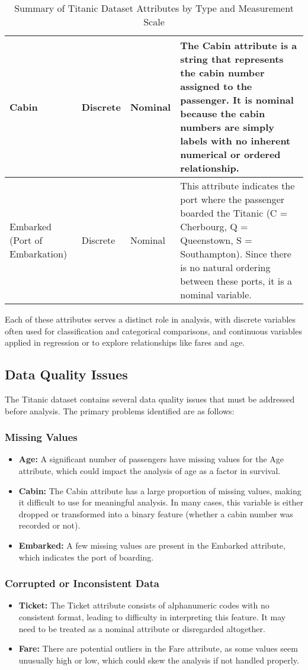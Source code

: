 \documentclass[twoside,11pt]{article}
\begin{document}
\begin{table}[h!]
\begin{tabular}{|l|l|l|p{8cm}|}
Cabin & Discrete & Nominal & The Cabin attribute is a string that represents the cabin number assigned to the passenger. It is nominal because the cabin numbers are simply labels with no inherent numerical or ordered relationship. \\ \hline
Embarked (Port of Embarkation) & Discrete & Nominal & This attribute indicates the port where the passenger boarded the Titanic (C = Cherbourg, Q = Queenstown, S = Southampton). Since there is no natural ordering between these ports, it is a nominal variable. \\ \hline
\end{tabular}
\caption{Summary of Titanic Dataset Attributes by Type and Measurement Scale}
\end{table}

Each of these attributes serves a distinct role in analysis, with discrete variables often used for classification and categorical comparisons, and continuous variables applied in regression or to explore relationships like fares and age.

\subsection{Data Quality Issues}
The Titanic dataset contains several data quality issues that must be addressed before analysis. The primary problems identified are as follows:

\subsubsection{Missing Values}
\begin{itemize}
    \item \textbf{Age:} A significant number of passengers have missing values for the Age attribute, which could impact the analysis of age as a factor in survival.
    \item \textbf{Cabin:} The Cabin attribute has a large proportion of missing values, making it difficult to use for meaningful analysis. In many cases, this variable is either dropped or transformed into a binary feature (whether a cabin number was recorded or not).
    \item \textbf{Embarked:} A few missing values are present in the Embarked attribute, which indicates the port of boarding.
\end{itemize}

\subsubsection{Corrupted or Inconsistent Data}
\begin{itemize}
    \item \textbf{Ticket:} The Ticket attribute consists of alphanumeric codes with no consistent format, leading to difficulty in interpreting this feature. It may need to be treated as a nominal attribute or disregarded altogether.
    \item \textbf{Fare:} There are potential outliers in the Fare attribute, as some values seem unusually high or low, which could skew the analysis if not handled properly.
\end{itemize}
\end{document}
